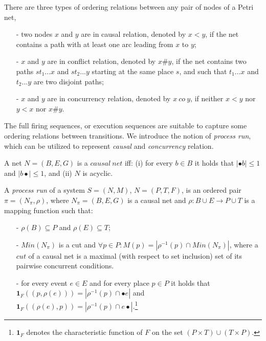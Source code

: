 \documentclass{llncs}
\begin{document}
\begin{definition}\label{def:orderingRelations}
There are three types of ordering relations between any pair of nodes of a Petri net,
	\begin{itemize}
		\item[-] two nodes $x$ and $y$ are in causal relation, denoted by $x<y$, if the net contains a path with at least one arc leading from $x$ to $y$;
		\item[-] $x$ and $y$ are in conflict relation, denoted by $x\#y$, if the net contains two paths $st_{1}...x$ and $st_{2}...y$ starting at the same place $s$, and such that $t_{1}...x$ and $t_{2}...y$ are two disjoint paths;
		\item[-] $x$ and $y$ are in concurrency relation, denoted by $x~co~y$, if neither $x<y$ nor $y<x$ nor $x\#y$.
	\end{itemize}
\end{definition}

The full firing sequences, or execution sequences are suitable to capture some ordering relations between transitions. We introduce the notion of \textit{process run}, which can be utilized to represent \textit{causal} and \textit{concurrency} relation.

\begin{definition}\label{def:causalNet}
A net $N=(B,E,G)$ is a $causal~net$ iff: (i) for every $b\in B$ it holds that $|\bullet b|\leq 1$ and $|b\bullet|\leq 1$, and (ii) $N$ is acyclic.
\end{definition}

\begin{definition}\label{def:run}
A \textit{process run} of a system $S=(N,M)$, $N=(P,T,F)$, is an ordered pair $\pi=(N_{\pi},\rho)$, where $N_{\pi}=(B,E,G)$ is a causal net and $\rho:B\cup E\rightarrow P\cup T$ is a mapping function such that:
	\begin{itemize}
		\item[-] $\rho(B)\subseteq P$ and $\rho(E)\subseteq T$;
		\item[-] $Min(N_{\pi})$ is a cut and $\forall p\in P:M(p)=|\rho^{-1}(p)\cap Min(N_{\pi})|$, where a $cut$ of a causal net is a maximal (with respect to set inclusion) set of its pairwise concurrent conditions.
		\item[-] for every event $e\in E$ and for every place $p\in P$ it holds that $\bm{1}_{F}((p,\rho(e)))=|\rho^{-1}(p)\cap\bullet e|$ and $\bm{1}_{F}((\rho(e),p))=|\rho^{-1}(p)\cap e\bullet|$.\footnote{$\bm{1}_{F}$ denotes the characteristic function of $F$ on the set $(P\times T)\cup(T\times P)$.}
	\end{itemize}
\end{definition}
\end{document}
